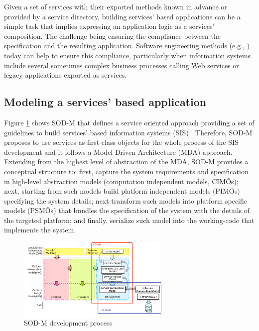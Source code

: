 Given a set of services with their exported methods known in advance or provided by a  service directory, building services' based applications can be  a simple task that implies expressing an application logic as a services' composition. The challenge being  ensuring the compliance between the specification and the resulting application. Software engineering methods (e.g., \cite{1,2,decastro1,PapazoglouH06}) today can help to ensure this compliance, particularly when information systems include several sometimes complex business processes calling Web services or legacy applications exported as services. 

\subsection{Modeling a services' based application}
 Figure \ref{fig:sodm} shows  SOD-M that defines a service oriented approach   providing  a set of guidelines to build services' based information systems (SIS) \cite{decastro1,decastro2}.  Therefore, SOD-M proposes to use services as first-class objects for the whole process of the SIS  development and it  follows a Model Driven Architecture (MDA) \cite{miller}  approach. Extending from the highest level of abstraction of the MDA, SOD-M provides  a conceptual structure to: first, capture the system requirements and specification in high-level abstraction models (computation independent models, CIMÕs); next,  starting from such models build platform independent models (PIMÕs) specifying the system details; next transform such models into platform specific models (PSMÕs) that bundles the specification of the system with the details of the targeted platform; and finally, serialize such model into the working-code that implements the system. 
\begin{figure} [htpb]
\centering
\includegraphics[width=0.65\textwidth]{figs/SODM}
\caption{SOD-M development process}
\label{fig:sodm}
\end{figure} 
